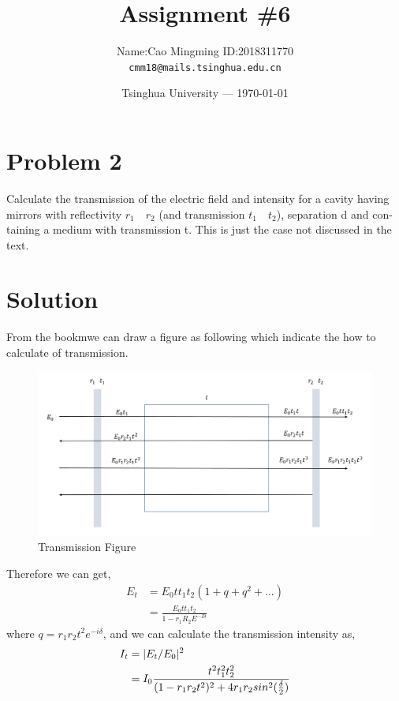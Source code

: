 \documentclass{article}
\title{Assignment \#6}
\author{Name:Cao Mingming \indent \indent ID:2018311770\\ \texttt{cmm18@mails.tsinghua.edu.cn}}
\date{Tsinghua University --- \today}
\begin{document}
	\maketitle %


\section{Problem 2}
 Calculate the transmission of the electric field and intensity for a cavity having mirrors with reflectivity $r_1 \quad r_2$ (and transmission $t_1 \quad t_2$), separation d and con-
taining a medium with transmission t. This is just the case not discussed in the text.

\section*{Solution}
From the bookmwe can draw a figure as following which indicate the how to calculate of transmission.
\begin{figure}[htb]
	\centering
	\includegraphics[width=0.8\linewidth]{f2}
	\caption{Transmission Figure}
	\label{fig:f2}
\end{figure}
Therefore we can get,
	\begin{equation}\label{key}
		\begin{aligned}
		E_t&=E_0tt_1t_2(1+q+q^2+...)\\
		&=\frac{E_0tt_1t_2}{1-r_1R_2E^{-I\delta}}
		\end{aligned}
	\end{equation}
where $q=r_1r_2t^2e^{-i\delta}$, and we can calculate the transmission intensity as,
\begin{equation}\label{key}
	\begin{aligned}
		I_t&=|E_t\//E_0|^2\\
		&=I_0\frac{t^2t_1^2t_2^2}{(1-r_1r_2t^2)^2+4r_1r_2sin^2(\frac{\delta}{2})}
	\end{aligned}
\end{equation}
\end{document}
